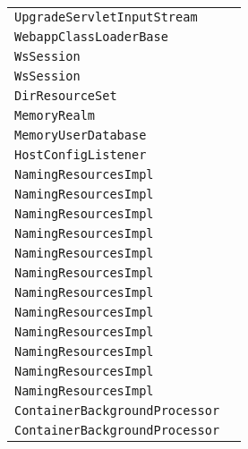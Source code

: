\begin{center}
\begin{tabular}{ll}
\lstinline/UpgradeServletInputStream/&\raisebox{0pt}{\lstinline/ onError(Throwablet)/}\\ 
\lstinline/WebappClassLoaderBase/&\raisebox{0pt}{\lstinline/ findClassInternal(String)/}\\ 
\lstinline/WsSession/&\raisebox{0pt}{\lstinline/ onClose(CloseReasoncloseReason)/}\\ 
\lstinline/WsSession/&\raisebox{0pt}{\lstinline/ onClose(CloseReasoncloseReason)/}\\ 
\lstinline/DirResourceSet/&\raisebox{0pt}{\lstinline/ initInternal())/}\\ 
\lstinline/MemoryRealm/&\raisebox{0pt}{\lstinline/ DigestergetDigester()/}\\ 
\lstinline/MemoryUserDatabase/&\raisebox{0pt}{\lstinline/ save())/}\\ 
\lstinline/HostConfigListener/&\raisebox{0pt}{\lstinline/ checkUndeploy()/}\\ 
\lstinline/NamingResourcesImpl/&\raisebox{0pt}{\lstinline/ destroyInternal())/}\\ 
\lstinline/NamingResourcesImpl/&\raisebox{0pt}{\lstinline/ destroyInternal())/}\\ 
\lstinline/NamingResourcesImpl/&\raisebox{0pt}{\lstinline/ destroyInternal())/}\\ 
\lstinline/NamingResourcesImpl/&\raisebox{0pt}{\lstinline/ destroyInternal())/}\\ 
\lstinline/NamingResourcesImpl/&\raisebox{0pt}{\lstinline/ destroyInternal())/}\\ 
\lstinline/NamingResourcesImpl/&\raisebox{0pt}{\lstinline/ destroyInternal())/}\\ 
\lstinline/NamingResourcesImpl/&\raisebox{0pt}{\lstinline/ destroyInternal())/}\\ 
\lstinline/NamingResourcesImpl/&\raisebox{0pt}{\lstinline/ destroyInternal())/}\\ 
\lstinline/NamingResourcesImpl/&\raisebox{0pt}{\lstinline/ destroyInternal())/}\\ 
\lstinline/NamingResourcesImpl/&\raisebox{0pt}{\lstinline/ destroyInternal())/}\\ 
\lstinline/NamingResourcesImpl/&\raisebox{0pt}{\lstinline/ destroyInternal())/}\\ 
\lstinline/NamingResourcesImpl/&\raisebox{0pt}{\lstinline/ destroyInternal())/}\\ 
\lstinline/ContainerBackgroundProcessor/&\raisebox{0pt}{\lstinline/ processChildren(Container)/}\\ 
\lstinline/ContainerBackgroundProcessor/&\raisebox{0pt}{\lstinline/ processChildren(Container)/}\\ 

\end{tabular}
\end{center}
